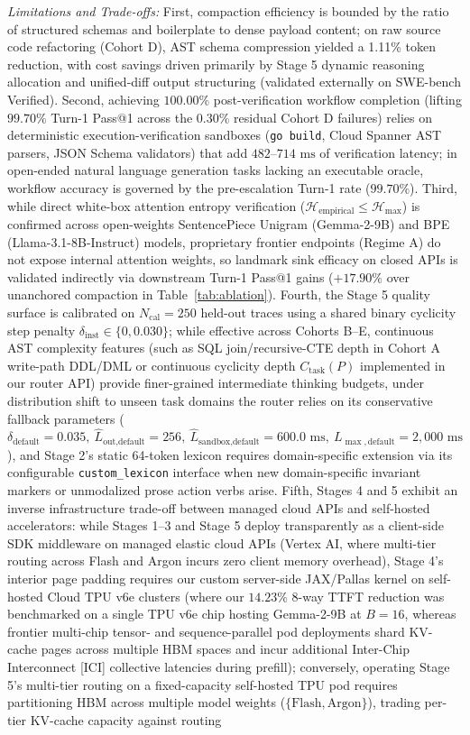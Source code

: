 \documentclass[conference,10pt]{IEEEtran}
\begin{document}
\textit{Limitations and Trade-offs:} First, compaction efficiency is bounded by the ratio of structured schemas and boilerplate to dense payload content; on raw source code refactoring (Cohort D), AST schema compression yielded a 1.11\% token reduction, with cost savings driven primarily by Stage 5 dynamic reasoning allocation and unified-diff output structuring (validated externally on SWE-bench Verified). Second, achieving $100.00\%$ post-verification workflow completion (lifting $99.70\%$ Turn-1 Pass@1 across the $0.30\%$ residual Cohort D failures) relies on deterministic execution-verification sandboxes (\texttt{go build}, Cloud Spanner AST parsers, JSON Schema validators) that add $482\text{--}714\text{ ms}$ of verification latency; in open-ended natural language generation tasks lacking an executable oracle, workflow accuracy is governed by the pre-escalation Turn-1 rate ($99.70\%$). Third, while direct white-box attention entropy verification ($\mathcal{H}_{\text{empirical}} \le \mathcal{H}_{\max}$) is confirmed across open-weights SentencePiece Unigram (Gemma-2-9B) and BPE (Llama-3.1-8B-Instruct) models, proprietary frontier endpoints (Regime A) do not expose internal attention weights, so landmark sink efficacy on closed APIs is validated indirectly via downstream Turn-1 Pass@1 gains ($+17.90\%$ over unanchored compaction in Table~\ref{tab:ablation}). Fourth, the Stage 5 quality surface is calibrated on $N_{\text{cal}}=250$ held-out traces using a shared binary cyclicity step penalty $\delta_{\text{inst}} \in \{0, 0.030\}$; while effective across Cohorts B--E, continuous AST complexity features (such as SQL join/recursive-CTE depth in Cohort A write-path DDL/DML or continuous cyclicity depth $C_{\text{task}}(P)$ implemented in our router API) provide finer-grained intermediate thinking budgets, under distribution shift to unseen task domains the router relies on its conservative fallback parameters ($\delta_{\text{default}}=0.035,\ \hat{L}_{\text{out,default}}=256,\ \hat{L}_{\text{sandbox,default}}=600.0\text{ ms},\ L_{\max,\text{default}}=2{,}000\text{ ms}$), and Stage 2's static 64-token lexicon requires domain-specific extension via its configurable \texttt{custom\_lexicon} interface when new domain-specific invariant markers or unmodalized prose action verbs arise. Fifth, Stages 4 and 5 exhibit an inverse infrastructure trade-off between managed cloud APIs and self-hosted accelerators: while Stages 1--3 and Stage 5 deploy transparently as a client-side SDK middleware on managed elastic cloud APIs (Vertex AI, where multi-tier routing across Flash and Argon incurs zero client memory overhead), Stage 4's interior page padding requires our custom server-side JAX/Pallas kernel on self-hosted Cloud TPU v6e clusters (where our $14.23\%$ 8-way TTFT reduction was benchmarked on a single TPU v6e chip hosting Gemma-2-9B at $B=16$, whereas frontier multi-chip tensor- and sequence-parallel pod deployments shard KV-cache pages across multiple HBM spaces and incur additional Inter-Chip Interconnect [ICI] collective latencies during prefill); conversely, operating Stage 5's multi-tier routing on a fixed-capacity self-hosted TPU pod requires partitioning HBM across multiple model weights ($\{\text{Flash}, \text{Argon}\}$), trading per-tier KV-cache capacity against routing 
\end{document}
